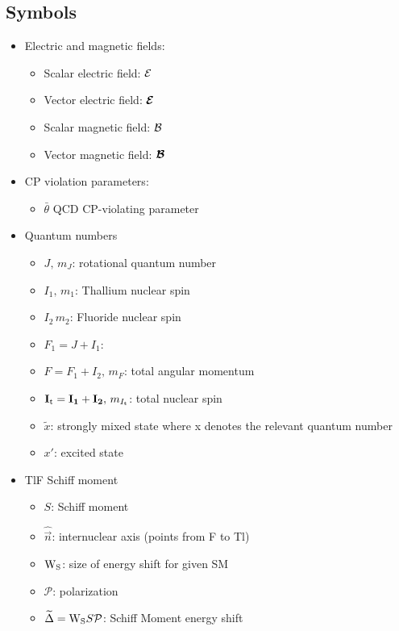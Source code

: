 \subsection{Symbols}
\begin{itemize}
    \item Electric and magnetic fields:
    \begin{itemize}
        \item Scalar electric field: $\mathcal{E}$
        \item Vector electric field: $\bm{\mathcal{E}}$
        \item Scalar magnetic field: $\mathcal{B}$
        \item Vector magnetic field: $\bm{\mathcal{B}}$
    \end{itemize}
    \item CP violation parameters:
    \begin{itemize}
        \item $\bar{\theta}$ QCD CP-violating parameter 
    \end{itemize}
    \item Quantum numbers
    \begin{itemize}
        \item $J,\,m_J$: rotational quantum number
        \item $I_1,\,m_1$: Thallium nuclear spin
        \item $I_2\,m_2$: Fluoride nuclear spin
        \item $F_1 = J+I_1$: 
        \item $F = F_1 + I_2,\,m_F$: total angular momentum
        \item $\mathbf{I_\text{t}} = \mathbf{I_1}+\mathbf{I_2},\, m_{I_\text{t}}$: total nuclear spin
        \item $\widetilde{x}$: strongly mixed state where x denotes the relevant quantum number
        \item $x'$: excited state
    \end{itemize}
    \item TlF Schiff moment
    \begin{itemize}
        \item $S$: Schiff moment
        \item $\hat{\vec{n}}$: internuclear axis (points from F to Tl)
        \item ${\rm W}_{\rm S}$: size of energy shift for given SM
        \item $\mathcal{P}$: polarization
        \item $\widetilde{\Delta} = {\rm W}_{\rm S}S\mathcal{P}$: Schiff Moment energy shift

\end{itemize}
\end{itemize}
